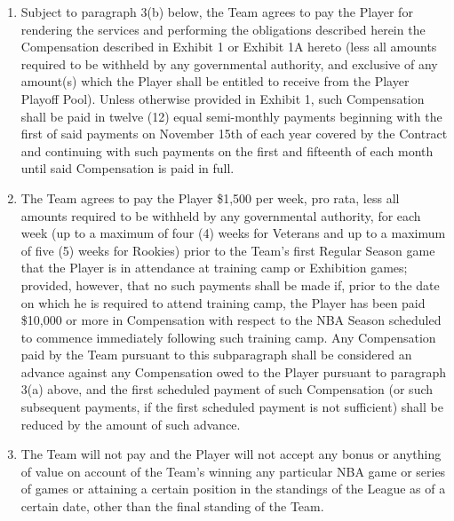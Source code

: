 \documentclass[
]{book}
\providecommand{\tightlist}{%
  \setlength{\itemsep}{0pt}\setlength{\parskip}{0pt}}
\begin{document}
\begin{enumerate}
\def\labelenumi{(\alph{enumi})}
\tightlist
\item
  Subject to paragraph 3(b) below, the Team agrees to pay the Player for rendering the services and performing the obligations described herein the Compensation described in Exhibit 1 or Exhibit 1A hereto (less all amounts required to be withheld by any governmental authority, and exclusive of any amount(s) which the Player shall be entitled to receive from the Player Playoff Pool). Unless otherwise provided in Exhibit 1, such Compensation shall be paid in twelve (12) equal semi-monthly payments beginning with the first of said payments on November 15th of each year covered by the Contract and continuing with such payments on the first and fifteenth of each month until said Compensation is paid in full.
\item
  The Team agrees to pay the Player \$1,500 per week, pro rata, less all amounts required to be withheld by any governmental authority, for each week (up to a maximum of four (4) weeks for Veterans and up to a maximum of five (5) weeks for Rookies) prior to the Team's first Regular Season game that the Player is in attendance at training camp or Exhibition games; provided, however, that no such payments shall be made if, prior to the date on which he is required to attend training camp, the Player has been paid \$10,000 or more in Compensation with respect to the NBA Season scheduled to commence immediately following such training camp. Any Compensation paid by the Team pursuant to this subparagraph shall be considered an advance against any Compensation owed to the Player pursuant to paragraph 3(a) above, and the first scheduled payment of such Compensation (or such subsequent payments, if the first scheduled payment is not sufficient) shall be reduced by the amount of such advance.
\item
  The Team will not pay and the Player will not accept any bonus or anything of value on account of the Team's winning any particular NBA game or series of games or attaining a certain position in the standings of the League as of a certain date, other than the final standing of the Team.
\end{enumerate}
\end{document}
